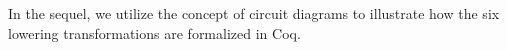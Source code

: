 In the sequel, we utilize the concept of circuit diagrams to illustrate how the six lowering transformations are formalized in Coq. 




